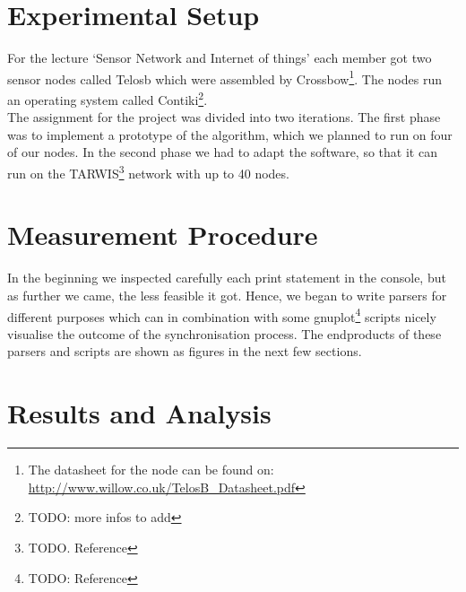 \documentclass{llncs}
\begin{document}
\section{Experimental Setup}

For the lecture `Sensor Network and Internet of things' each member got two sensor nodes called Telosb which were assembled by Crossbow\footnote{The datasheet for the node can be found on: \url{http://www.willow.co.uk/TelosB_Datasheet.pdf}}. The nodes run an operating system called Contiki\footnote{TODO: more infos to add}.\\
The assignment for the project was divided into two iterations. The first phase was to implement a prototype of the algorithm, which we planned to run on four of our nodes. In the second phase we had to adapt the software, so that it can run on the TARWIS\footnote{TODO. Reference} network with up to 40 nodes.



\section{Measurement Procedure}
In the beginning we inspected carefully each print statement in the console, but as further we came, the less feasible it got. Hence, we began to write parsers for different purposes which can in combination with some gnuplot\footnote{TODO: Reference} scripts nicely visualise the outcome of the synchronisation process. The endproducts of these parsers and scripts are shown as figures in the next few sections.
\newpage
\section{Results and Analysis}
\end{document}
